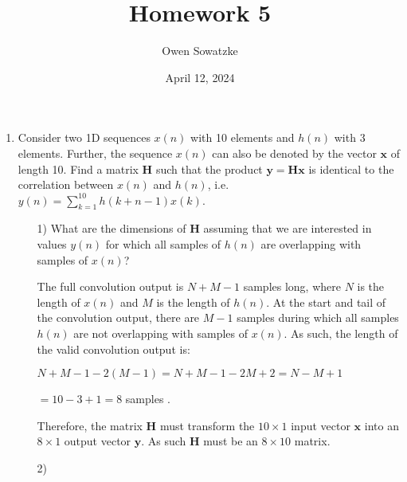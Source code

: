 \documentclass[fleqn]{article}
\title{Homework 5}
\author{Owen Sowatzke}
\date{April 12, 2024}
\newcommand{\zerodisplayskip}{
	\setlength{\abovedisplayskip}{0pt}%
	\setlength{\belowdisplayskip}{0pt}%
	\setlength{\abovedisplayshortskip}{0pt}%
	\setlength{\belowdisplayshortskip}{0pt}%
	\setlength{\mathindent}{0pt}}
\begin{document}
	\offinterlineskip
	\setlength{\lineskip}{12pt}
	\zerodisplayskip
	\maketitle
	
	\begin{enumerate}
		\item Consider two 1D sequences $x(n)$ with 10 elements and $h(n)$ with 3 elements. Further, the sequence $x(n)$ can also be denoted by the vector $\mathbf{x}$ of length 10. Find a matrix $\mathbf{H}$ such that the product $\mathbf{y} = \mathbf{Hx}$ is identical to the correlation between $x(n)$ and $h(n)$, i.e. $y(n) = \sum_{k=1}^{10}{h(k+n-1)x(k)}$.
		
		\begin{enumerate}
			\item [1)] What are the dimensions of $\mathbf{H}$ assuming that we are interested in values $y(n)$ for which all samples of $h(n)$ are overlapping with samples of $x(n)$?
			
			The full convolution output is $N + M - 1$ samples long, where $N$ is the length of $x(n)$ and $M$ is the length of $h(n)$. At the start and tail of the convolution output, there are $M - 1$ samples during which all samples $h(n)$ are not overlapping with samples of $x(n)$. As such, the length of the valid convolution output is:
			
			$N + M - 1 - 2(M - 1) = N + M - 1 - 2M + 2 = N - M + 1$
			
			$ = 10 - 3 + 1 = 8$ samples .
			
			Therefore, the matrix $\mathbf{H}$ must transform the $10 \times 1$ input vector $\mathbf{x}$ into an $8 \times 1$ output vector $\mathbf{y}$.  As such $\mathbf{H}$ must be an $8 \times 10$ matrix.
			
			\item [2)] 
		\end{enumerate}
	\end{enumerate}
\end{document}

